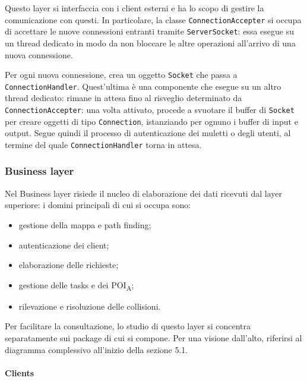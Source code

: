 Questo layer si interfaccia con i client esterni e ha lo scopo di gestire la comunicazione con questi. In particolare, la classe \texttt{ConnectionAccepter} si occupa di accettare le nuove connessioni entranti tramite \texttt{ServerSocket}: essa esegue su un thread dedicato in modo da non bloccare le altre operazioni all'arrivo di una nuova connessione.

Per ogni nuova connessione, crea un oggetto \texttt{Socket} che passa a \texttt{ConnectionHandler}. Quest'ultima è una componente che esegue su un altro thread dedicato: rimane in attesa fino al risveglio determinato da \texttt{ConnectionAccepter}: una volta attivato, procede a svuotare il buffer di \texttt{Socket} per creare oggetti di tipo \texttt{Connection}, istanziando per ognuno i buffer di input e output. Segue quindi il processo di autenticazione dei muletti o degli utenti, al termine del quale \texttt{ConnectionHandler} torna in attesa.






\clearpage
\subsubsection{Business layer}

Nel Business layer risiede il nucleo di elaborazione dei dati ricevuti dal layer superiore: i domini principali di cui si occupa sono:
\begin{itemize}
	\item gestione della mappa e path finding;
	\item autenticazione dei client;
    \item elaborazione delle richieste;
	\item gestione delle tasks e dei POI\textsubscript{A};
	\item rilevazione e risoluzione delle collisioni.
\end{itemize}
Per facilitare la consultazione, lo studio di questo layer si concentra separatamente sui package di cui si compone. Per una visione dall'alto, riferirsi al diagramma complessivo all'inizio della sezione 5.1.



\clearpage
\paragraph{Clients}
\subparagraph*{ }

